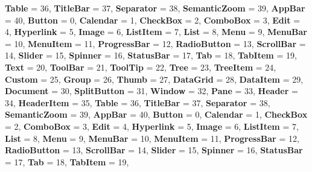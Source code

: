 \begin{DoxyCompactItemize}
{\bfseries Table} = 36, 
{\bfseries Title\+Bar} = 37, 
{\bfseries Separator} = 38, 
{\bfseries Semantic\+Zoom} = 39, 
\newline
{\bfseries App\+Bar} = 40, 
{\bfseries Button} = 0, 
{\bfseries Calendar} = 1, 
{\bfseries Check\+Box} = 2, 
\newline
{\bfseries Combo\+Box} = 3, 
{\bfseries Edit} = 4, 
{\bfseries Hyperlink} = 5, 
{\bfseries Image} = 6, 
\newline
{\bfseries List\+Item} = 7, 
{\bfseries List} = 8, 
{\bfseries Menu} = 9, 
{\bfseries Menu\+Bar} = 10, 
\newline
{\bfseries Menu\+Item} = 11, 
{\bfseries Progress\+Bar} = 12, 
{\bfseries Radio\+Button} = 13, 
{\bfseries Scroll\+Bar} = 14, 
\newline
{\bfseries Slider} = 15, 
{\bfseries Spinner} = 16, 
{\bfseries Status\+Bar} = 17, 
{\bfseries Tab} = 18, 
\newline
{\bfseries Tab\+Item} = 19, 
{\bfseries Text} = 20, 
{\bfseries Tool\+Bar} = 21, 
{\bfseries Tool\+Tip} = 22, 
\newline
{\bfseries Tree} = 23, 
{\bfseries Tree\+Item} = 24, 
{\bfseries Custom} = 25, 
{\bfseries Group} = 26, 
\newline
{\bfseries Thumb} = 27, 
{\bfseries Data\+Grid} = 28, 
{\bfseries Data\+Item} = 29, 
{\bfseries Document} = 30, 
\newline
{\bfseries Split\+Button} = 31, 
{\bfseries Window} = 32, 
{\bfseries Pane} = 33, 
{\bfseries Header} = 34, 
\newline
{\bfseries Header\+Item} = 35, 
{\bfseries Table} = 36, 
{\bfseries Title\+Bar} = 37, 
{\bfseries Separator} = 38, 
\newline
{\bfseries Semantic\+Zoom} = 39, 
{\bfseries App\+Bar} = 40, 
{\bfseries Button} = 0, 
{\bfseries Calendar} = 1, 
\newline
{\bfseries Check\+Box} = 2, 
{\bfseries Combo\+Box} = 3, 
{\bfseries Edit} = 4, 
{\bfseries Hyperlink} = 5, 
\newline
{\bfseries Image} = 6, 
{\bfseries List\+Item} = 7, 
{\bfseries List} = 8, 
{\bfseries Menu} = 9, 
\newline
{\bfseries Menu\+Bar} = 10, 
{\bfseries Menu\+Item} = 11, 
{\bfseries Progress\+Bar} = 12, 
{\bfseries Radio\+Button} = 13, 
\newline
{\bfseries Scroll\+Bar} = 14, 
{\bfseries Slider} = 15, 
{\bfseries Spinner} = 16, 
{\bfseries Status\+Bar} = 17, 
\newline
{\bfseries Tab} = 18, 
{\bfseries Tab\+Item} = 19, 

\end{DoxyCompactItemize}
